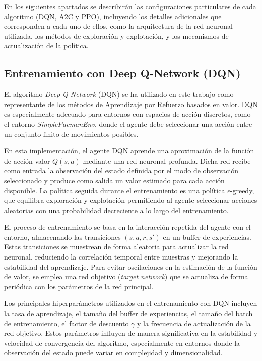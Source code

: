 En los siguientes apartados se describirán las configuraciones particulares de cada algoritmo (DQN, A2C y PPO), incluyendo los detalles adicionales que corresponden a cada uno de ellos, como la arquitectura de la red neuronal utilizada, los métodos de exploración y explotación, y los mecanismos de actualización de la política.

\subsection{Entrenamiento con Deep Q-Network (DQN)}

El algoritmo \textit{Deep Q-Network} (DQN) se ha utilizado en este trabajo como representante de los métodos de Aprendizaje por Refuerzo basados en valor. DQN es especialmente adecuado para entornos con espacios de acción discretos, como el entorno \textit{SimplePacmanEnv}, donde el agente debe seleccionar una acción entre un conjunto finito de movimientos posibles.

En esta implementación, el agente DQN aprende una aproximación de la función de acción-valor $Q(s,a)$ mediante una red neuronal profunda. Dicha red recibe como entrada la observación del estado definida por el modo de observación seleccionado y produce como salida un valor estimado para cada acción disponible. La política seguida durante el entrenamiento es una política $\epsilon$-greedy, que equilibra exploración y explotación permitiendo al agente seleccionar acciones aleatorias con una probabilidad decreciente a lo largo del entrenamiento.

El proceso de entrenamiento se basa en la interacción repetida del agente con el entorno, almacenando las transiciones $(s, a, r, s')$ en un buffer de experiencias. Estas transiciones se muestrean de forma aleatoria para actualizar la red neuronal, reduciendo la correlación temporal entre muestras y mejorando la estabilidad del aprendizaje. Para evitar oscilaciones en la estimación de la función de valor, se emplea una red objetivo (\textit{target network}) que se actualiza de forma periódica con los parámetros de la red principal.

Los principales hiperparámetros utilizados en el entrenamiento con DQN incluyen la tasa de aprendizaje, el tamaño del buffer de experiencias, el tamaño del batch de entrenamiento, el factor de descuento $\gamma$ y la frecuencia de actualización de la red objetivo. Estos parámetros influyen de manera significativa en la estabilidad y velocidad de convergencia del algoritmo, especialmente en entornos donde la observación del estado puede variar en complejidad y dimensionalidad.

